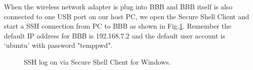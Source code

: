 \documentclass[12pt,journal,draftclsnofoot,onecolumn]{IEEEtran}
\begin{document}
When the wireless network adapter is plug into BBB and BBB itself is also connected to one USB port on our host PC, we open the Secure Shell Client and start a SSH connection from PC to BBB as shown in Fig.\ref{ssh}. Remember the default IP address for BBB is 192.168.7.2 and the default user account is `ubuntu' with password "temppwd".
\begin{figure}[htb]
	\centering

     \caption{SSH log on via Secure Shell Client for Windows.}\label{ssh}
     \end{figure}
\end{document}
